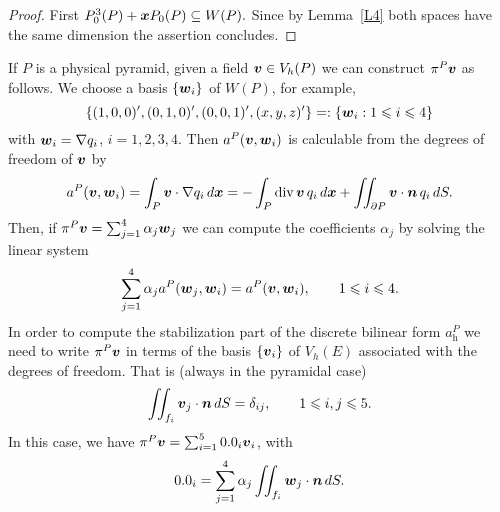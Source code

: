 \begin{proof}
First $P_0^3(P)+{\boldsymbol{x}} P_0(P)\subseteq W(P).$
Since by Lemma~\ref{L4} both spaces have the same dimension the assertion concludes.
\end{proof}
If $P$ is a physical pyramid, given a field $\boldsymbol{v} \in V_h(P)$ we can construct $\pi^P\boldsymbol{v}$
as follows. We choose a basis $\{\boldsymbol{w}_i\}$ of $W(P)$, for
example,
\[
\left\{ (1,0,0)', (0,1,0)', (0,0,1)', (x,y,z)' \right\} =: \{
\boldsymbol{w}_i: 1\leqslant i\leqslant 4\}
\]
with $\boldsymbol{w}_i=\nabla q_i$, $i=1,2,3,4$. Then $a^P(\boldsymbol{v},\boldsymbol{w}_i)$ is 
calculable from the degrees of freedom of $\boldsymbol{v}$ by
\[
a^P(\boldsymbol{v},\boldsymbol{w}_i) = \int_P\boldsymbol{v}\cdot\nabla q_i\,d\boldsymbol{x} =
-\int_P\mbox{div\,}\boldsymbol{v}\,q_i\,d\boldsymbol{x} + \iint_{\partial P}\boldsymbol{v}\cdot\boldsymbol{n}\,q_i\,dS.
\]
Then, if $\pi^P\boldsymbol{v}=\sum_{j=1}^4\alpha_j\boldsymbol{w}_j$ we can
compute the coefficients $\alpha_j$ by solving the linear system
\[
\sum_{j=1}^4\alpha_j a^P(\boldsymbol{w}_j,\boldsymbol{w}_i) =
a^P(\boldsymbol{v},\boldsymbol{w}_i), \qquad 1\leqslant i\leqslant 4.
\]
In order to compute the stabilization part of the discrete
bilinear form $a_\textit{h}^P$ we need to write $\pi^P\boldsymbol{v}$ in terms
of the basis $\{\boldsymbol{v}_i\}$ of $V_h(E)$ associated with
the degrees of freedom. That is (always in the pyramidal case)
\[
\iint_{f_i}\boldsymbol{v}_j\cdot\boldsymbol{n}\,dS =\delta_{ij}, \qquad 1\leqslant i,j\leqslant 5.
\]
In this case, we have $\pi^P\bv = \sum_{i=1}^5\beta_i\bv_i$,
with
\[
\beta_i=\sum_{j=1}^4\alpha_j\iint_{f_i}\bw_j\cdot\bn\,dS.
\]
